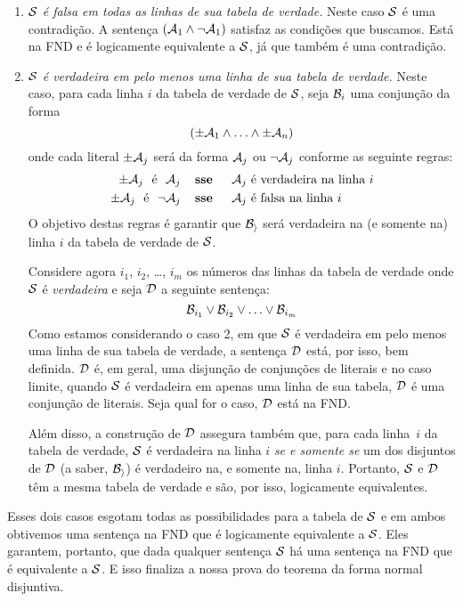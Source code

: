 	\begin{enumerate}
		\item \emph{$\mathcal{S}$ é falsa em todas as linhas de sua tabela de verdade.} Neste caso  $\mathcal{S}$ é uma contradição.
		A sentença $(\mathcal{A}_1 \wedge \neg \mathcal{A}_1)$ satisfaz as condições que buscamos.
		Está na FND e é logicamente equivalente a $\mathcal{S}$, já que também é uma contradição.
	
		\item\emph{$\mathcal{S}$ é verdadeira em pelo menos uma linha de sua tabela de verdade.}
		Neste caso, para cada linha $i$ da tabela de verdade de $\mathcal{S}$, seja $\mathcal{B}_i$ uma conjunção da forma
		$$(\pm\mathcal{A}_{1} \land \ldots \land \pm\mathcal{A}_{n})$$
		onde cada literal $\pm\mathcal{A}_{j}$ será da forma $\mathcal{A}_{j}$ ou $\neg\mathcal{A}_{j}$ conforme as seguinte regras:
			\begin{align*}
				\pm\meta{A}_{j}\text{ \ é \ }\meta{A}_{j}&\emph{ \ \ sse \ \ \ }\meta{A}_{j}\text{ é verdadeira na linha }i\\
				\pm\meta{A}_{j}\text{ \ é \ }\enot\meta{A}_{j}&\emph{ \ \ sse \ \ \ }\meta{A}_{j}\text{ é falsa na linha }i
			\end{align*}
		O objetivo destas regras é garantir que  $\mathcal{B_i}$ será verdadeira na (e somente na) linha $i$ da tabela de verdade de $\mathcal{S}$.
		
		Considere agora  $i_1$, $i_2$, \dots, $i_m$ os números das linhas da tabela de verdade onde $\mathcal{S}$ é \emph{verdadeira} e seja $\mathcal{D}$ a seguinte sentença:
		$$\mathcal{B}_{i_1} \vee \mathcal{B}_{i_2} \vee \ldots \vee \mathcal{B}_{i_m}$$
		Como estamos considerando o caso 2, em que $\mathcal{S}$ é verdadeira em pelo menos uma linha de sua tabela de verdade, a sentença $\mathcal{D}$ está, por isso, bem definida.
		$\mathcal{D}$ é, em geral, uma disjunção de conjunções de literais e no caso limite, quando $\mathcal{S}$ é verdadeira em apenas uma linha de sua tabela, $\mathcal{D}$ é uma conjunção de literais.
		Seja qual for o caso, $\mathcal{D}$ está na FND.
		
		Além disso, a construção de $\mathcal{D}$ assegura também que, para cada linha~$i$ da tabela de verdade, $\mathcal{S}$ é verdadeira na linha $i$ \emph{se e somente se} um dos disjuntos de $\mathcal{D}$ (a saber, $\mathcal{B_i}$) é verdadeiro na, e somente na, linha $i$.
		Portanto, $\mathcal{S}$ e $\mathcal{D}$ têm a mesma tabela de verdade e são, por isso, logicamente equivalentes.
	\end{enumerate}
	Esses dois casos esgotam todas as possibilidades para a tabela de $\mathcal{S}$ e em ambos obtivemos uma sentença na FND que é logicamente equivalente a $\mathcal{S}$.
	Eles garantem, portanto, que dada qualquer sentença $\mathcal{S}$ há uma sentença na FND que é equivalente a $\mathcal{S}$. E isso finaliza a nossa prova do teorema da forma normal disjuntiva.

